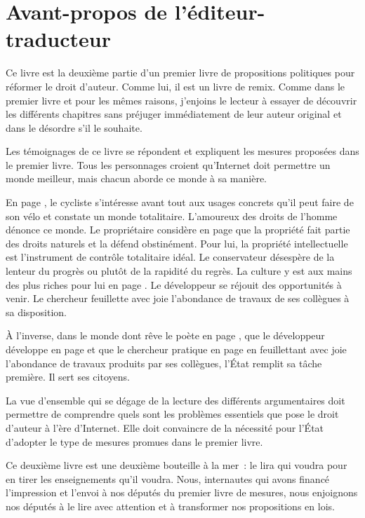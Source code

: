 \chapter*{Avant-propos de l'éditeur-traducteur}

Ce livre est la deuxième partie d'un premier livre de propositions politiques pour réformer le droit d'auteur. Comme lui, il est un livre de remix. Comme dans le premier livre et pour les mêmes raisons, j'enjoins le lecteur à essayer de découvrir les différents chapitres sans préjuger immédiatement de leur auteur original et dans le désordre s'il le souhaite.

Les témoignages de ce livre se répondent et expliquent les mesures proposées dans le premier livre. Tous les personnages croient qu'Internet doit permettre un monde meilleur, mais chacun aborde ce monde à sa manière. 

En page \pageref{cycliste}, le cycliste s'intéresse avant tout aux usages concrets qu'il peut faire de son vélo et constate un monde totalitaire. L'amoureux des droits de l'homme dénonce ce monde. Le propriétaire considère en page \pageref{proprio} que la propriété fait partie des droits naturels et la défend obstinément. Pour lui, la propriété intellectuelle est l'instrument de contrôle totalitaire idéal. Le conservateur désespère de la lenteur du progrès ou plutôt de la rapidité du regrès. La culture y est aux mains des plus riches pour lui en page  \pageref{conserv}. Le développeur se réjouit des opportunités à venir. Le chercheur feuillette avec joie l'abondance de travaux de ses collègues à sa disposition. 

À l'inverse, dans le monde dont rêve le poète en page \pageref{poete}, que le développeur développe en page \pageref{devadmin} et que le chercheur pratique en page \pageref{cherch} en feuillettant avec joie l'abondance de travaux produits par ses collègues, l'État remplit sa tâche première. Il sert ses citoyens.

La vue d'ensemble qui se dégage de la lecture des différents argumentaires doit permettre de comprendre quels sont les problèmes essentiels que pose le droit d'auteur à l'ère d'Internet. Elle doit convaincre de la nécessité pour l'État d'adopter le type de mesures promues dans le premier livre.

Ce deuxième livre est une deuxième bouteille à la mer~: le lira qui voudra pour en tirer les enseignements qu'il voudra. Nous, internautes qui avons financé l'impression et l'envoi à nos députés du premier livre de mesures, nous enjoignons nos députés à le lire avec attention et à transformer nos propositions en lois. 
